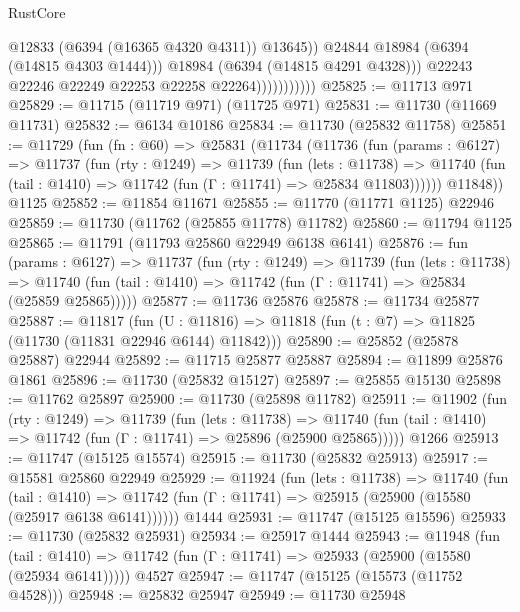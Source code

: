 \begin{lexlean}{RustCore}
\begin{coremodule}
                                  @12833
                                  (@6394 (@16365 @4320 @4311))
                                  @13645))
                              @24844
                              @18984
                              (@6394 (@14815 @4303 @1444)))
                            @18984
                            (@6394 (@14815 @4291 @4328)))
                          @22243
                          @22246
                          @22249
                          @22253
                          @22258
                          @22264)))))))))))
@25825 := @11713 @971
@25829 := @11715 (@11719 @971) (@11725 @971)
@25831 := @11730 (@11669 @11731)
@25832 := @6134 @10186
@25834 := @11730 (@25832 @11758)
@25851 := @11729
    (fun (fn : @60) =>
    @25831
      (@11734
        (@11736
          (fun (params : @6127) =>
          @11737
            (fun (rty : @1249) =>
            @11739
              (fun (lets : @11738) =>
              @11740 (fun (tail : @1410) => @11742 (fun (Γ : @11741) => @25834 @11803))))))
        @11848))
    @1125
@25852 := @11854 @11671
@25855 := @11770 (@11771 @1125) @22946
@25859 := @11730 (@11762 (@25855 @11778) @11782)
@25860 := @11794 @1125
@25865 := @11791 (@11793 @25860 @22949 @6138 @6141)
@25876 := fun (params : @6127) =>
  @11737
    (fun (rty : @1249) =>
    @11739
      (fun (lets : @11738) =>
      @11740 (fun (tail : @1410) => @11742 (fun (Γ : @11741) => @25834 (@25859 @25865)))))
@25877 := @11736 @25876
@25878 := @11734 @25877
@25887 := @11817
    (fun (U : @11816) => @11818 (fun (t : @7) => @11825 (@11730 (@11831 @22946 @6144) @11842)))
@25890 := @25852 (@25878 @25887) @22944
@25892 := @11715 @25877 @25887
@25894 := @11899 @25876 @1861
@25896 := @11730 (@25832 @15127)
@25897 := @25855 @15130
@25898 := @11762 @25897
@25900 := @11730 (@25898 @11782)
@25911 := @11902
    (fun (rty : @1249) =>
    @11739
      (fun (lets : @11738) =>
      @11740 (fun (tail : @1410) => @11742 (fun (Γ : @11741) => @25896 (@25900 @25865)))))
    @1266
@25913 := @11747 (@15125 @15574)
@25915 := @11730 (@25832 @25913)
@25917 := @15581 @25860 @22949
@25929 := @11924
    (fun (lets : @11738) =>
    @11740
      (fun (tail : @1410) =>
      @11742 (fun (Γ : @11741) => @25915 (@25900 (@15580 (@25917 @6138 @6141))))))
    @1444
@25931 := @11747 (@15125 @15596)
@25933 := @11730 (@25832 @25931)
@25934 := @25917 @1444
@25943 := @11948
    (fun (tail : @1410) => @11742 (fun (Γ : @11741) => @25933 (@25900 (@15580 (@25934 @6141)))))
    @4527
@25947 := @11747 (@15125 (@15573 (@11752 @4528)))
@25948 := @25832 @25947
@25949 := @11730 @25948

\end{coremodule}
\end{lexlean}
